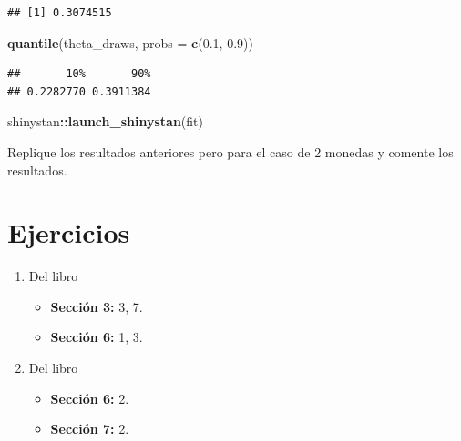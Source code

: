 \documentclass[
  12pt,
]{book}
\newenvironment{Shaded}{\begin{snugshade}}{\end{snugshade}}
\newcommand{\DataTypeTok}[1]{\textcolor[rgb]{0.13,0.29,0.53}{#1}}
\newcommand{\FloatTok}[1]{\textcolor[rgb]{0.00,0.00,0.81}{#1}}
\newcommand{\KeywordTok}[1]{\textcolor[rgb]{0.13,0.29,0.53}{\textbf{#1}}}
\newcommand{\NormalTok}[1]{#1}
\newcommand{\OperatorTok}[1]{\textcolor[rgb]{0.81,0.36,0.00}{\textbf{#1}}}
\newcommand{\StringTok}[1]{\textcolor[rgb]{0.31,0.60,0.02}{#1}}
\providecommand{\tightlist}{%
  \setlength{\itemsep}{0pt}\setlength{\parskip}{0pt}}
\theoremstyle{definition}
\theoremstyle{definition}
\theoremstyle{definition}
\theoremstyle{remark}
\let\BeginKnitrBlock\begin \let\EndKnitrBlock\end
\begin{document}
\begin{Shaded}
\end{Shaded}

\begin{verbatim}
## [1] 0.3074515
\end{verbatim}

\begin{Shaded}
\begin{Highlighting}[]
\KeywordTok{quantile}\NormalTok{(theta_draws, }\DataTypeTok{probs =} \KeywordTok{c}\NormalTok{(}\FloatTok{0.1}\NormalTok{, }\FloatTok{0.9}\NormalTok{))}
\end{Highlighting}
\end{Shaded}

\begin{verbatim}
##       10%       90% 
## 0.2282770 0.3911384
\end{verbatim}

\begin{Shaded}
\begin{Highlighting}[]
\NormalTok{shinystan}\OperatorTok{::}\KeywordTok{launch_shinystan}\NormalTok{(fit)}
\end{Highlighting}
\end{Shaded}

\BeginKnitrBlock{exercise}
\protect\hypertarget{exr:unnamed-chunk-167}{}{\label{exr:unnamed-chunk-167} }
Replique los resultados anteriores pero para el caso de 2 monedas y comente los resultados.
\EndKnitrBlock{exercise}

\hypertarget{ejercicios-2}{%
\section{Ejercicios}\label{ejercicios-2}}

\begin{enumerate}
\def\labelenumi{\arabic{enumi}.}
\tightlist
\item
  Del libro \autocite{Albert2009}

  \begin{itemize}
  \tightlist
  \item
    \textbf{Sección 3:} 3, 7.
  \item
    \textbf{Sección 6:} 1, 3.
  \end{itemize}
\item
  Del libro \autocite{Kruschke2014}

  \begin{itemize}
  \tightlist
  \item
    \textbf{Sección 6:} 2.
  \item
    \textbf{Sección 7:} 2.
  \end{itemize}
\end{enumerate}
\end{document}
